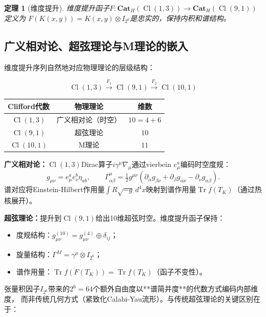 \documentclass[12pt,a4paper]{ctexart}
\newtheorem{theorem}{定理}[section]
\newcommand{\Cl}{\operatorname{Cl}}
\newcommand{\Cat}{\mathbf{Cat}}
\newcommand{\Tr}{\operatorname{Tr}}
\begin{document}
\begin{theorem}[维度提升]
维度提升函子$F: \Cat_H(\Cl(1,3)) \to \Cat_H(\Cl(9,1))$定义为
$F(K(x,y)) = K(x,y) \otimes I_{2^6}$是忠实的，保持内积和谱结构。
\end{theorem}

\subsection{广义相对论、超弦理论与M理论的嵌入}

维度提升序列自然地对应物理理论的层级结构：

\[
\Cl(1,3) \xrightarrow{F_1} \Cl(9,1) \xrightarrow{F_2} \Cl(10,1)
\]

\begin{center}
\begin{tabular}{c|c|c}
\hline
Clifford代数 & 物理理论 & 维数 \\
\hline
$\Cl(1,3)$ & 广义相对论（时空） & $10 = 4+6$ \\
$\Cl(9,1)$ & 超弦理论 & $10$ \\
$\Cl(10,1)$ & M理论 & $11$ \\
\hline
\end{tabular}
\end{center}

\textbf{广义相对论：}$\Cl(1,3)$Dirac算子$i\gamma^\mu\nabla_\mu$通过vierbein $e^a_\mu$编码时空度规：
\begin{equation}
g_{\mu\nu} = e^a_\mu e^b_\nu \eta_{ab}, \qquad 
\Gamma^\mu_{\alpha\beta} = \tfrac12 g^{\mu\nu}(\partial_\alpha g_{\beta\nu} + \partial_\beta g_{\alpha\nu} - \partial_\nu g_{\alpha\beta}).
\end{equation}
谱对应将Einstein-Hilbert作用量$\int R\sqrt{-g}\,d^4x$映射到谱作用量$\Tr f(T_K)$（通过热核展开）。

\textbf{超弦理论：}提升到$\Cl(9,1)$给出10维超弦时空。维度提升函子保持：
\begin{itemize}
  \item 度规结构：$g_{\mu\nu}^{(10)} = g_{\mu\nu}^{(4)} \oplus \delta_{ij}$；
  \item 旋量结构：$\Gamma^M = \gamma^\mu \otimes I_{2^6}$；
  \item 谱作用量：$\Tr f(F(T_K)) = \Tr f(T_K)$（函子不变性）。
\end{itemize}

张量积因子$I_{2^6}$带来的$2^6 = 64$个额外自由度以**谱简并度**的代数方式编码内部维度，
而非传统几何方式（紧致化Calabi-Yau流形）。与传统超弦理论的关键区别在于：
\end{document}

